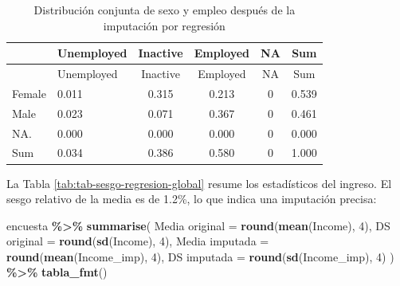 \documentclass[
  spanish,
  12pt,
]{book}
\newenvironment{Shaded}{\begin{snugshade}}{\end{snugshade}}
\newcommand{\AttributeTok}[1]{\textcolor[rgb]{0.13,0.29,0.53}{#1}}
\newcommand{\DecValTok}[1]{\textcolor[rgb]{0.00,0.00,0.81}{#1}}
\newcommand{\FunctionTok}[1]{\textcolor[rgb]{0.13,0.29,0.53}{\textbf{#1}}}
\newcommand{\NormalTok}[1]{#1}
\newcommand{\OtherTok}[1]{\textcolor[rgb]{0.56,0.35,0.01}{#1}}
\newcommand{\SpecialCharTok}[1]{\textcolor[rgb]{0.81,0.36,0.00}{\textbf{#1}}}
\newcommand{\StringTok}[1]{\textcolor[rgb]{0.31,0.60,0.02}{#1}}
\begin{document}
\begin{Shaded}
\end{Shaded}

\begin{longtable}[]{@{}llcccc@{}}
\caption{\label{tab:tab-regresion-empleo-sexo-despues}Distribución conjunta de sexo y empleo después de la imputación por regresión}\tabularnewline
\toprule\noalign{}
& Unemployed & Inactive & Employed & NA & Sum \\
\midrule\noalign{}
\endfirsthead
\toprule\noalign{}
& Unemployed & Inactive & Employed & NA & Sum \\
\midrule\noalign{}
\endhead
\bottomrule\noalign{}
\endlastfoot
Female & 0.011 & 0.315 & 0.213 & 0 & 0.539 \\
Male & 0.023 & 0.071 & 0.367 & 0 & 0.461 \\
NA. & 0.000 & 0.000 & 0.000 & 0 & 0.000 \\
Sum & 0.034 & 0.386 & 0.580 & 0 & 1.000 \\
\end{longtable}

La Tabla \ref{tab:tab-sesgo-regresion-global} resume los estadísticos del ingreso. El sesgo relativo de la media es de 1.2\%, lo que indica una imputación precisa:

\begin{Shaded}
\begin{Highlighting}[]
\NormalTok{encuesta }\SpecialCharTok{\%\textgreater{}\%}
  \FunctionTok{summarise}\NormalTok{(}
    \StringTok{\textasciigrave{}}\AttributeTok{Media original}\StringTok{\textasciigrave{}}  \OtherTok{=} \FunctionTok{round}\NormalTok{(}\FunctionTok{mean}\NormalTok{(Income), }\DecValTok{4}\NormalTok{),}
    \StringTok{\textasciigrave{}}\AttributeTok{DS original}\StringTok{\textasciigrave{}}     \OtherTok{=} \FunctionTok{round}\NormalTok{(}\FunctionTok{sd}\NormalTok{(Income), }\DecValTok{4}\NormalTok{),}
    \StringTok{\textasciigrave{}}\AttributeTok{Media imputada}\StringTok{\textasciigrave{}}  \OtherTok{=} \FunctionTok{round}\NormalTok{(}\FunctionTok{mean}\NormalTok{(Income\_imp), }\DecValTok{4}\NormalTok{),}
    \StringTok{\textasciigrave{}}\AttributeTok{DS imputada}\StringTok{\textasciigrave{}}     \OtherTok{=} \FunctionTok{round}\NormalTok{(}\FunctionTok{sd}\NormalTok{(Income\_imp), }\DecValTok{4}\NormalTok{)}
\NormalTok{  ) }\SpecialCharTok{\%\textgreater{}\%} \FunctionTok{tabla\_fmt}\NormalTok{()}
\end{Highlighting}
\end{Shaded}
\end{document}
